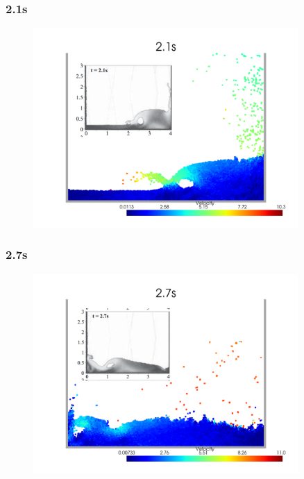 \begin{frame}
    \frametitle{\subsecname 2.1s}
    \begin{figure}[H]
        \centering
        \includegraphics[width=0.9\textwidth]{images/collapse_dry21_combined.png}
    \end{figure}
\end{frame}

\begin{frame}
    \frametitle{\subsecname 2.7s}
    \begin{figure}[H]
        \centering
        \includegraphics[width=0.9\textwidth]{images/collapse_dry27_combined.png}
    \end{figure}
\end{frame}

